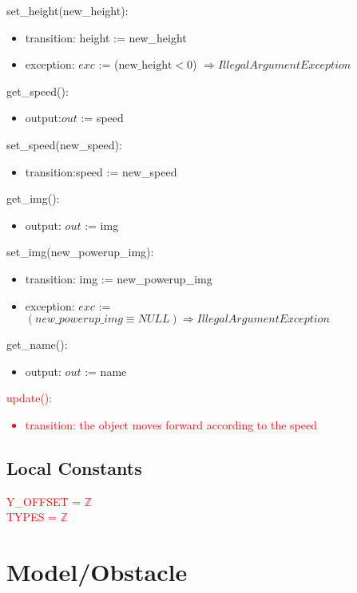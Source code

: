 \documentclass[12pt]{article}
\begin{document}
\noindent set\_height(new\_height):
\begin{itemize}
    \item transition: height := new\_height
    \item exception: $exc$ := ($\text{new\_height} < 0$) $\Rightarrow  IllegalArgumentException$
\end{itemize}


\noindent get\_speed():
\begin{itemize}
    \item output:$out$ := speed
\end{itemize}


\noindent set\_speed(new\_speed):
\begin{itemize}
    \item transition:speed := new\_speed
\end{itemize}


\noindent get\_img():
\begin{itemize}
    \item output: $out$ := img 
\end{itemize}


\noindent set\_img(new\_powerup\_img):
\begin{itemize}
    \item transition: img := new\_powerup\_img
    \item exception: $exc$ := $(new\_powerup\_img \equiv NULL) \Rightarrow IllegalArgumentException$
\end{itemize}

\noindent get\_name():
\begin{itemize}
    \item output: $out$ := name
\end{itemize}

\noindent \textcolor{red}{update():
\begin{itemize}
    \item transition: the object moves forward according to the speed
\end{itemize}}

\subsection*{Local Constants}
\textcolor{red}{Y\_OFFSET = $\mathbb{Z}$\\
TYPES = $\mathbb{Z}$}
\newpage

\section*{Model/Obstacle}
\end{document}
